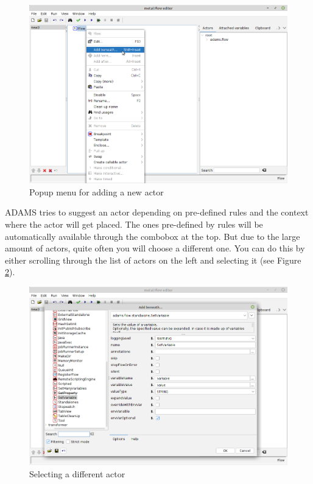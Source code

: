 \begin{figure}[htb]
  \centering
  \includegraphics[width=12.0cm]{images/floweditor-helloworld-addactor1.png}
  \caption{Popup menu for adding a new actor}
  \label{floweditor-helloworld-addactor1}
\end{figure}

ADAMS tries to suggest an actor depending on pre-defined rules and the context 
where the actor will get placed. The ones pre-defined by rules will be 
automatically available through the combobox at the top. But due to the large 
amount of actors, quite often you will choose a different one. You can do this 
by either scrolling through the list of actors on the left and selecting it
(see Figure \ref{floweditor-helloworld-addactor2}).

\begin{figure}[htb]
  \centering
  \includegraphics[width=12.0cm]{images/floweditor-helloworld-addactor2.png}
  \caption{Selecting a different actor}
  \label{floweditor-helloworld-addactor2}
\end{figure}

